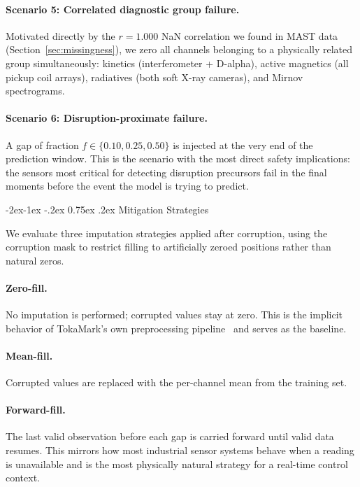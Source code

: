 \documentclass[10pt,twocolumn]{article}
\makeatletter
\renewcommand\subsection{\@startsection{subsection}{2}{\z@}%
  {-2ex\@plus -1ex \@minus -.2ex}%
  {0.75ex \@plus .2ex}%
  {\normalfont\large\bfseries}}
\makeatother
\begin{document}
\paragraph{Scenario 5: Correlated diagnostic group failure.}
Motivated directly by the $r = 1.000$ NaN correlation we found in MAST
data (Section~\ref{sec:missingness}), we zero all channels belonging to
a physically related group simultaneously: kinetics (interferometer +
D-alpha), active magnetics (all pickup coil arrays), radiatives (both
soft X-ray cameras), and Mirnov spectrograms.

\paragraph{Scenario 6: Disruption-proximate failure.}
A gap of fraction $f \in \{0.10, 0.25, 0.50\}$ is injected at the very
end of the prediction window. This is the scenario with the most direct
safety implications: the sensors most critical for detecting disruption
precursors fail in the final moments before the event the model is
trying to predict.

\subsection{Mitigation Strategies}

We evaluate three imputation strategies applied after corruption, using
the corruption mask to restrict filling to artificially zeroed positions
rather than natural zeros.

\paragraph{Zero-fill.} No imputation is performed; corrupted values stay
at zero. This is the implicit behavior of TokaMark's own preprocessing
pipeline~\cite{rousseau2026tokamark} and serves as the baseline.

\paragraph{Mean-fill.} Corrupted values are replaced with the per-channel
mean from the training set.

\paragraph{Forward-fill.} The last valid observation before each gap is
carried forward until valid data resumes. This mirrors how most industrial
sensor systems behave when a reading is unavailable and is the most
physically natural strategy for a real-time control context.
\end{document}
